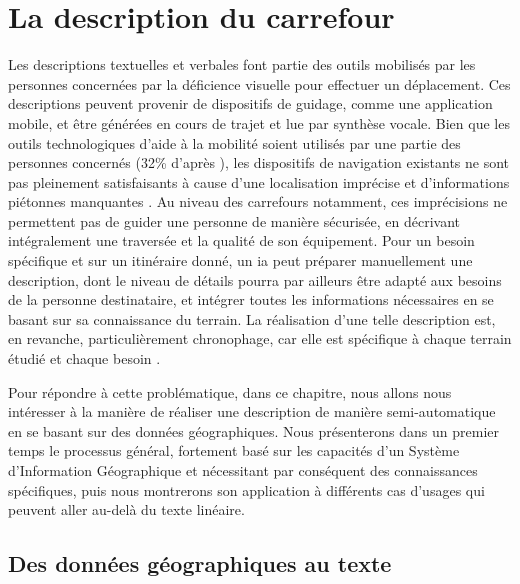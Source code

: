 \chapter{La description du carrefour}

\label{chap:description}



Les descriptions textuelles et verbales font partie des outils mobilisés par les personnes concernées par la déficience visuelle pour effectuer un déplacement. Ces descriptions peuvent provenir de dispositifs de guidage, comme une application mobile, et être générées en cours de trajet et lue par synthèse vocale. Bien que les outils technologiques d'aide à la mobilité soient utilisés par une partie des personnes concernés (32\% d’après \citet{homere_2023}), les dispositifs de navigation existants ne sont pas pleinement satisfaisants à cause d’une localisation imprécise et d’informations piétonnes manquantes \citep{Guth2019}. Au niveau des carrefours notamment, ces imprécisions ne permettent pas de guider une personne de manière sécurisée, en décrivant intégralement une traversée et la qualité de son équipement. Pour un besoin spécifique et sur un itinéraire donné, un \gls{ia} peut préparer manuellement une description, dont le niveau de détails pourra par ailleurs être adapté aux besoins de la personne destinataire, et intégrer toutes les informations nécessaires en se basant sur sa connaissance du terrain. La réalisation d’une telle description est, en revanche, particulièrement chronophage, car elle est spécifique à chaque terrain étudié et chaque besoin \citep{kern2016}.

\newpar{}

Pour répondre à cette problématique, dans ce chapitre, nous allons nous intéresser à la manière de réaliser une description de manière semi-automatique en se basant sur des données géographiques. Nous présenterons dans un premier temps le processus général, fortement basé sur les capacités d’un Système d’Information Géographique et nécessitant par conséquent des connaissances spécifiques, puis nous montrerons son application à différents cas d’usages qui peuvent aller au-delà du texte linéaire.


\section{Des données géographiques au texte}

